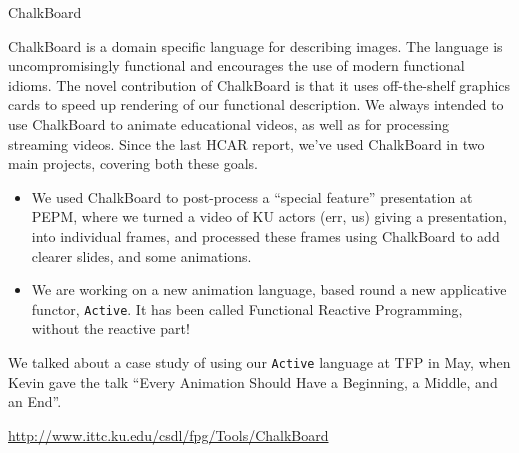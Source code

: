 \documentclass{article}
\begin{document}
\begin{hcarentry}{ChalkBoard}
\makeheader

ChalkBoard is a domain specific language for describing images. 
The language is uncompromisingly functional
and encourages the use of modern functional idioms.
The novel contribution of ChalkBoard is that it uses off-the-shelf
graphics cards to speed up rendering of our functional description.
We always intended to use ChalkBoard to animate educational
videos, as well as for processing streaming videos.
Since the last HCAR report, we've used ChalkBoard in two main projects,
covering both these goals.
\begin{itemize}
\item We used ChalkBoard to post-process a
``special feature'' presentation at PEPM, where we turned
a video of KU actors (err, us) giving a presentation, into individual frames,
and processed these frames using ChalkBoard to add clearer slides, and some animations.
\item We are working on a new animation language, based round a new applicative
functor, \verb|Active|. It has been called Functional Reactive Programming,
without the reactive part!
\end{itemize}

We talked about a case study of using our \verb|Active| language at TFP in May,
when Kevin gave the talk ``Every Animation Should Have a Beginning, a Middle, and an End''.

\FurtherReading
  \url{http://www.ittc.ku.edu/csdl/fpg/Tools/ChalkBoard}

\end{hcarentry}
\end{document}
